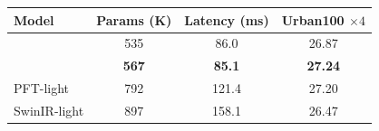 \small
\setlength{\tabcolsep}{4pt}
\begin{tabular}{lccc}
\toprule
Model & Params (K) & Latency (ms) & Urban100 \(\times4\) \\
\midrule
\baseline{} & 535 & 86.0 & 26.87 \\
\textbf{\method{}} & \textbf{567} & \textbf{85.1} & \textbf{27.24} \\
PFT-light & 792 & 121.4 & 27.20 \\
SwinIR-light & 897 & 158.1 & 26.47 \\
\bottomrule
\end{tabular}
